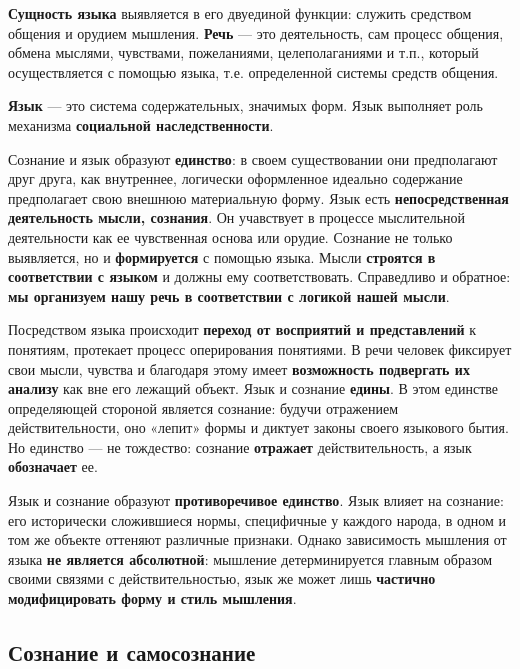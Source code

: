 \documentclass{article}
\begin{document}
\begin{flushleft}

\textbf{Сущность языка} выявляется в его двуединой функции: служить средством общения и орудием мышления. \textbf{Речь} — это деятельность, сам процесс общения, обмена мыслями, чувствами, пожеланиями, целеполаганиями и т.п., который осуществляется с помощью языка, т.е. определенной системы средств общения.

\textbf{Язык} — это система содержательных, значимых форм. Язык выполняет роль механизма \textbf{социальной наследственности}.

Сознание и язык образуют \textbf{единство}: в своем существовании они предполагают друг друга, как внутреннее, логически оформленное идеально содержание предполагает свою внешнюю материальную форму. Язык есть \textbf{непосредственная деятельность мысли, сознания}. Он учавствует в процессе мыслительной деятельности как ее чувственная основа или орудие. Сознание не только выявляется, но и \textbf{формируется} с помощью языка. Мысли \textbf{строятся в соответствии с языком} и должны ему соответствовать. Справедливо и обратное: \textbf{мы организуем нашу речь в соответствии с логикой нашей мысли}.

Посредством языка происходит \textbf{переход от восприятий и представлений} к понятиям, протекает процесс оперирования понятиями. В речи человек фиксирует свои мысли, чувства и благодаря этому имеет \textbf{возможность подвергать их анализу} как вне его лежащий объект. Язык и сознание \textbf{едины}. В этом единстве определяющей стороной является сознание: будучи отражением действительности, оно «лепит» формы и диктует законы своего языкового бытия. Но единство — не тождество: сознание \textbf{отражает} действительность, а язык \textbf{обозначает} ее.

Язык и сознание образуют \textbf{противоречивое единство}. Язык влияет на сознание: его исторически сложившиеся нормы, специфичные у каждого народа, в одном и том же объекте оттеняют различные признаки. Однако зависимость мышления от языка \textbf{не является абсолютной}: мышление детерминируется главным образом своими связями с действительностью, язык же может лишь \textbf{частично модифицировать форму и стиль мышления}.

\end{flushleft}

\subsection{Сознание и самосознание}
\end{document}
